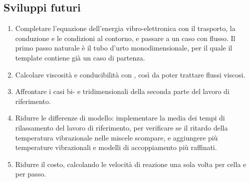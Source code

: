 \subsection{Sviluppi futuri}
\label{sec:sviluppi}

\begin{enumerate}[leftmargin=1.8em]
  \item Completare l'equazione dell'energia vibro-elettronica con il
    trasporto, la conduzione e le condizioni al contorno, e passare a un caso
    con flusso. Il primo passo naturale è il tubo d'urto monodimensionale, per
    il quale il template contiene già un caso di partenza.
  \item Calcolare viscosità e conducibilità con \mpp, così da poter trattare
    flussi viscosi.
  \item Affrontare i casi bi- e tridimensionali della seconda parte del lavoro
    di riferimento.
  \item Ridurre le differenze di modello: implementare la media dei tempi di
    rilassamento del lavoro di riferimento, per verificare se il ritardo della
    temperatura vibrazionale nelle miscele scompare, e aggiungere più
    temperature vibrazionali e modelli di accoppiamento più raffinati.
  \item Ridurre il costo, calcolando le velocità di reazione una sola volta
    per cella e per passo.
\end{enumerate}
